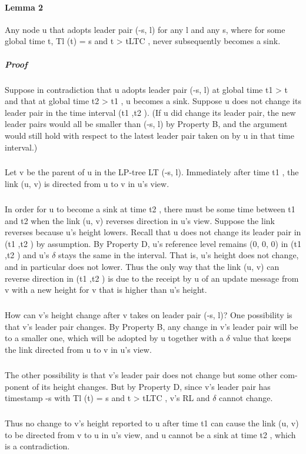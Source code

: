 \paragraph{Lemma 2}Any node u that adopts leader pair (-s, l) for any l and any s, where for some global time t, Tl (t) = s and t > tLTC , never subsequently becomes a sink.
\subparagraph{Proof}Suppose in contradiction that u adopts leader pair (-s, l) at global time t1 > t and that at global time t2 > t1 , u becomes a sink. Suppose u does not change its leader pair in the time interval (t1 ,t2 ). (If u did change its leader pair, the new leader pairs would all be smaller than (-s, l) by Property B, and the argument would still hold with respect to the latest leader pair taken on by u in that time interval.)
\subparagraph{}Let v be the parent of u in the LP-tree LT (-s, l). Immediately after time t1 , the link (u, v) is directed from u to v in u's view.
\subparagraph{}In order for u to become a sink at time t2 , there must be some time between t1 and t2 when the link (u, v) reverses direction in u's view. Suppose the link reverses because u's height lowers. Recall that u does not change its leader pair in (t1 ,t2 ) by assumption. By Property D, u's reference level remains (0, 0, 0) in (t1 ,t2 ) and u's $\delta$ stays the same in the interval. That is, u's height does not change, and in particular does not lower. Thus the only way that the link (u, v) can reverse direction in (t1 ,t2 ) is due to the receipt by u of an update message from v with a new height for v that is higher than u's height.
\subparagraph{}How can v's height change after v takes on leader pair (-s, l)? One possibility is that v's leader pair changes. By Property B, any change in v's leader pair will be to a smaller one, which will be adopted by u together with a $\delta$ value that keeps the link directed from u to v in u's view.
\subparagraph{}The other possibility is that v's leader pair does not change but some other com- ponent of its height changes. But by Property D, since v's leader pair has timestamp -s with Tl (t) = s and t > tLTC , v's RL and $\delta$ cannot change.
\subparagraph{}Thus no change to v's height reported to u after time t1 can cause the link (u, v) to be directed from v to u in u's view, and u cannot be a sink at time t2 , which is a contradiction.
